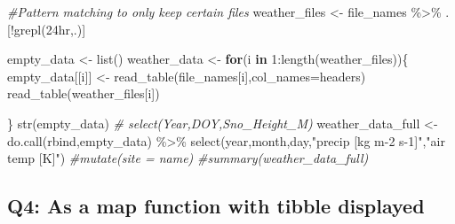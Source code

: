 \documentclass[
]{book}
\newenvironment{Shaded}{\begin{snugshade}}{\end{snugshade}}
\newcommand{\AttributeTok}[1]{\textcolor[rgb]{0.77,0.63,0.00}{#1}}
\newcommand{\CommentTok}[1]{\textcolor[rgb]{0.56,0.35,0.01}{\textit{#1}}}
\newcommand{\ControlFlowTok}[1]{\textcolor[rgb]{0.13,0.29,0.53}{\textbf{#1}}}
\newcommand{\DecValTok}[1]{\textcolor[rgb]{0.00,0.00,0.81}{#1}}
\newcommand{\FunctionTok}[1]{\textcolor[rgb]{0.00,0.00,0.00}{#1}}
\newcommand{\NormalTok}[1]{#1}
\newcommand{\OtherTok}[1]{\textcolor[rgb]{0.56,0.35,0.01}{#1}}
\newcommand{\SpecialCharTok}[1]{\textcolor[rgb]{0.00,0.00,0.00}{#1}}
\newcommand{\StringTok}[1]{\textcolor[rgb]{0.31,0.60,0.02}{#1}}
\begin{document}
\begin{Shaded}
\begin{Highlighting}[]
\CommentTok{\#Pattern matching to only keep certain files}
\NormalTok{weather\_files }\OtherTok{\textless{}{-}}\NormalTok{ file\_names }\SpecialCharTok{\%\textgreater{}\%}
\NormalTok{  .[}\SpecialCharTok{!}\FunctionTok{grepl}\NormalTok{(}\StringTok{\textquotesingle{}24hr\textquotesingle{}}\NormalTok{,.)] }

\NormalTok{empty\_data }\OtherTok{\textless{}{-}} \FunctionTok{list}\NormalTok{()}
\NormalTok{weather\_data }\OtherTok{\textless{}{-}} \ControlFlowTok{for}\NormalTok{(i }\ControlFlowTok{in} \DecValTok{1}\SpecialCharTok{:}\FunctionTok{length}\NormalTok{(weather\_files))\{}
\NormalTok{  empty\_data[[i]] }\OtherTok{\textless{}{-}} \FunctionTok{read\_table}\NormalTok{(file\_names[i],}\AttributeTok{col\_names=}\NormalTok{headers)}
    \FunctionTok{read\_table}\NormalTok{(weather\_files[i])}
  
\NormalTok{\}}
\FunctionTok{str}\NormalTok{(empty\_data)}
   \CommentTok{\# select(Year,DOY,Sno\_Height\_M)}
\NormalTok{weather\_data\_full }\OtherTok{\textless{}{-}} \FunctionTok{do.call}\NormalTok{(}\StringTok{\textquotesingle{}rbind\textquotesingle{}}\NormalTok{,empty\_data) }\SpecialCharTok{\%\textgreater{}\%}
    \FunctionTok{select}\NormalTok{(year,month,day,}\StringTok{"precip [kg m{-}2 s{-}1]"}\NormalTok{,}\StringTok{"air temp [K]"}\NormalTok{) }
    \CommentTok{\#mutate(site = name)}
\CommentTok{\#summary(weather\_data\_full)}
\end{Highlighting}
\end{Shaded}

\hypertarget{q4-as-a-map-function-with-tibble-displayed}{%
\subsection{Q4: As a map function with tibble displayed}\label{q4-as-a-map-function-with-tibble-displayed}}
\end{document}

